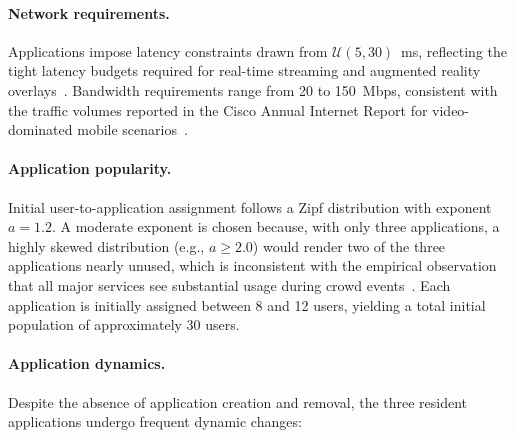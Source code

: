 \paragraph{Network requirements.} Applications impose latency constraints drawn from $\mathcal{U}(5, 30)$~ms, reflecting the tight latency budgets required for real-time streaming and augmented reality overlays~\cite{3GPP2018System}. Bandwidth requirements range from 20 to 150~Mbps, consistent with the traffic volumes reported in the Cisco Annual Internet Report for video-dominated mobile scenarios~\cite{CiscoAIR2023}.

\paragraph{Application popularity.} Initial user-to-application assignment follows a Zipf distribution with exponent $a = 1.2$. A moderate exponent is chosen because, with only three applications, a highly skewed distribution (e.g., $a \geq 2.0$) would render two of the three applications nearly unused, which is inconsistent with the empirical observation that all major services see substantial usage during crowd events~\cite{Breslau1999Web, Pujol2015Understanding}. Each application is initially assigned between 8 and 12 users, yielding a total initial population of approximately 30 users.

\paragraph{Application dynamics.} Despite the absence of application creation and removal, the three resident applications undergo frequent dynamic changes:

